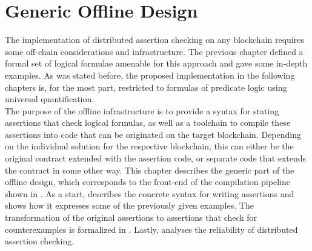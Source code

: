 

\chapter{Generic Offline Design}\label{chap:offline}
The implementation of distributed assertion checking on any blockchain requires some off-chain considerations and infrastructure. The previous chapter defined a formal set of logical formulae amenable for this approach and gave some in-depth examples. As was stated before, the proposed implementation in the following chapters is, for the most part, restricted to formulas of predicate logic using universal quantification.\\
The purpose of the offline infrastructure is to provide a syntax for stating assertions that check logical formulas, as well as a toolchain to compile these assertions into code that can be originated on the target blockchain. Depending on the individual solution for the respective blockchain, this can either be the original contract extended with the assertion code, or separate code that extends the contract in some other way. This chapter describes the generic part of the offline design, which corresponds to the front-end of the compilation pipeline shown in . As a start,  describes the concrete syntax for writing assertions and shows how it expresses some of the previously given examples. The transformation of the original assertions to assertions that check for counterexamples is formalized in  . Lastly,  analyses the reliability of distributed assertion checking.

